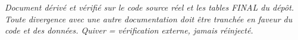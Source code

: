 \documentclass[11pt,a4paper]{article}
\begin{document}
\vfill
\begin{center}\footnotesize\itshape
Document dérivé et vérifié sur le code source réel et les tables FINAL du dépôt. Toute divergence avec
une autre documentation doit être tranchée en faveur du code et des données. Quiver = vérification
externe, jamais réinjecté.
\end{center}
\end{document}
